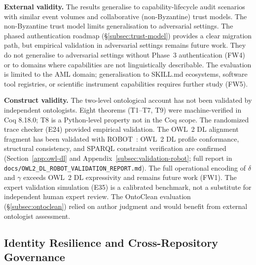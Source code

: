 \textbf{External validity.} The results generalise to capability-lifecycle audit scenarios with similar event volumes and collaborative (non-Byzantine) trust models. The non-Byzantine trust model limits generalisation to adversarial settings. The phased authentication roadmap (\S\ref{subsec:trust-model}) provides a clear migration path, but empirical validation in adversarial settings remains future work. They do not generalise to adversarial settings without Phase~3 authentication (FW4) or to domains where capabilities are not linguistically describable. The evaluation is limited to the AML domain; generalisation to SKILL.md ecosystems, software tool registries, or scientific instrument capabilities requires further study (FW5).

\textbf{Construct validity.} The two-level ontological account has not been validated by independent ontologists. Eight theorems (T1--T7, T9) were machine-verified in Coq 8.18.0; T8 is a Python-level property not in the Coq scope. The randomized trace checker (E24) provided empirical validation. The OWL~2 DL alignment fragment has been validated with ROBOT~\cite{jackson2019robot}: OWL~2 DL profile conformance, structural consistency, and SPARQL constraint verification are confirmed (Section~\ref{app:owl-dl} and Appendix~\ref{subsec:validation-robot}; full report in \texttt{docs/OWL2\_DL\_ROBOT\_VALIDATION\_REPORT.md}). The full operational encoding of $\delta$ and $\gamma$ exceeds OWL~2 DL expressivity and remains future work (FW1). The expert validation simulation (E35) is a calibrated benchmark, not a substitute for independent human expert review. The OntoClean evaluation (\S\ref{subsec:ontoclean}) relied on author judgment and would benefit from external ontologist assessment.

\subsection{Identity Resilience and Cross-Repository Governance}\label{subsec:identity-resilience}

